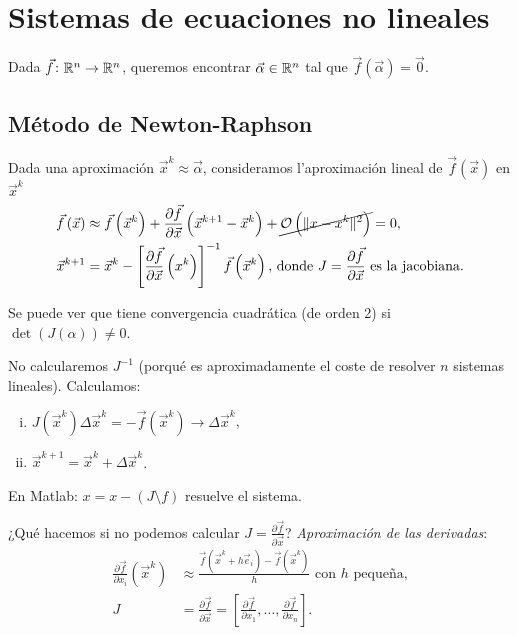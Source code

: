 \chapter{Sistemas de ecuaciones no lineales}

\noindent Dada $\vec{f} \colon \mathbb{R}^n \to \mathbb{R}^n$, queremos encontrar $\vec{\alpha} \in \mathbb{R}^n$ tal que $\vec{f}\left( \vec{\alpha} \right) = \vec{0}$.

\section{M\'etodo de Newton-Raphson}

\noindent Dada una aproximaci\'on $\vec{x}^k \approx \vec{\alpha}$, consideramos l'aproximaci\'on lineal de $\vec{f}\left( \vec{x} \right)$ en $\vec{x}^k$
\begin{align*}
    \vec{f}\left( \vec{x} \right) &\approx \vec{f}\left( \vec{x}^k \right) + \frac{\partial \vec{f}}{\partial \vec{x}}\left( \vec{x}^{k+1}-\vec{x}^k \right) + \cancel{\mathcal{O} \left( \|x-x^k\|^2 \right)} = 0, \\
    \vec{x}^{k+1} &= \vec{x}^k - \left[ \frac{\partial\vec{f}}{\partial\vec{x}}\left( x^k \right) \right]^{-1} \vec{f}\left( \vec{x}^k \right),\, \text{donde } J = \frac{\partial\vec{f}}{\partial \vec{x}} \text{ es la jacobiana.}
\end{align*}

\noindent Se puede ver que tiene convergencia cuadr\'atica (de orden 2) si $\det\left( J(\alpha) \right) \neq 0$.

\begin{obs}
    No calcularemos $J^{-1}$ (porqu\'e es aproximadamente el coste de resolver $n$ sistemas lineales). Calculamos:
    \begin{enumerate}[i)]
        \item $J\left( \vec{x}^k \right)\Delta \vec{x}^k = -\vec{f}\left( \vec{x}^k \right) \longrightarrow \Delta \vec{x}^k$,
        \item $\vec{x}^{k+1} = \vec{x}^k + \Delta\vec{x}^k$.
    \end{enumerate}
    En Matlab: $x = x-(J\setminus f)$ resuelve el sistema.
\end{obs}

\noindent ¿Qu\'e hacemos si no podemos calcular $J = \frac{\partial \vec{f}}{\partial \vec{x}}$?
\emph{Aproximaci\'on de las derivadas}:
\begin{align*}
    \frac{\partial \vec{f}}{\partial x_i}\left( \vec{x}^k \right) &\approx \frac{\vec{f}\left( \vec{x}^k + h\vec{e}_i \right) - \vec{f}\left( \vec{x}^k \right)}{h} \text{ con } h \text{ pequeña,} \\
    J &= \frac{\partial \vec{f}}{\partial \vec{x}} = \left[ \frac{\partial \vec{f}}{\partial x_1}, \dots, \frac{\partial \vec{f}}{\partial x_n} \right].
\end{align*}

